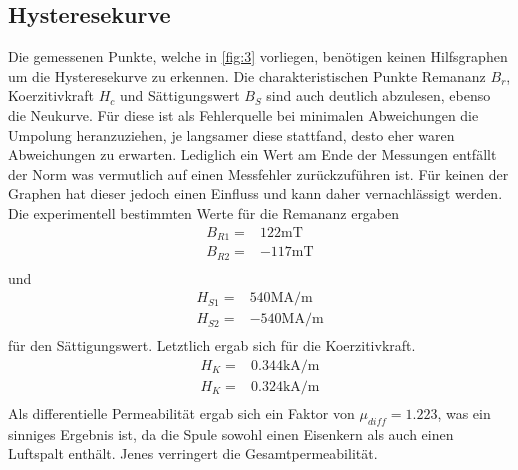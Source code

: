 \subsection{Hysteresekurve}
Die gemessenen Punkte, welche in \autoref{fig:3} vorliegen, benötigen keinen 
Hilfsgraphen um die Hysteresekurve zu erkennen. Die charakteristischen Punkte 
Remananz $B_r$, Koerzitivkraft $H_c$ und Sättigungswert $B_S$ sind auch deutlich 
abzulesen, ebenso die Neukurve. Für diese ist als Fehlerquelle bei minimalen 
Abweichungen die Umpolung heranzuziehen, je langsamer diese stattfand, desto 
eher waren Abweichungen zu erwarten. Lediglich ein Wert am Ende der Messungen
entfällt der Norm was vermutlich auf einen Messfehler zurückzuführen ist. Für
keinen der Graphen hat dieser jedoch einen Einfluss und kann daher vernachlässigt
werden. Die experimentell bestimmten Werte für die Remananz ergaben
\begin{align*}
    B_{R1} =& 122 \unit{\milli\tesla}\\
    B_{R2} =& -117 \unit{\milli\tesla}\\
\end{align*}
und 
\begin{align*}
    H_{S1} =& 540 \unit{\mega\ampere\per\meter}\\
    H_{S2} =& -540 \unit{\mega\ampere\per\meter}\\
\end{align*}
für den Sättigungswert. Letztlich ergab sich für die Koerzitivkraft.
\begin{align*}
    H_{K} =& 0.344 \unit{\kilo\ampere\per\meter}\\
    H_{K} =& 0.324 \unit{\kilo\ampere\per\meter}\\
\end{align*}
Als differentielle Permeabilität ergab sich ein Faktor von $\mu_{diff}=1.223$,
was ein sinniges Ergebnis ist, da die Spule sowohl einen Eisenkern als auch
einen Luftspalt enthält. Jenes verringert die Gesamtpermeabilität.

